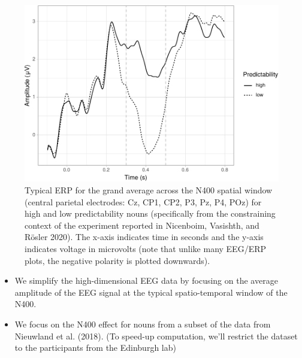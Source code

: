 \documentclass[12pt,ignorenonframetext,aspectratio=169]{beamer}
\providecommand{\tightlist}{%
  \setlength{\itemsep}{0pt}\setlength{\parskip}{0pt}}
\begin{document}
\begin{frame}

\small

\begin{figure}

{\centering \includegraphics[width=0.8\linewidth,height=0.7\textheight]{cc_figure/N400noun-1} 

}

\caption{Typical ERP for the grand average across the N400 spatial window (central parietal electrodes: Cz, CP1, CP2, P3, Pz, P4, POz) for high and low predictability nouns (specifically from the constraining context of the experiment reported in Nicenboim, Vasishth, and Rösler 2020). The x-axis indicates time in seconds and the y-axis indicates voltage in microvolts (note that unlike many EEG/ERP plots, the negative polarity is plotted downwards). }\label{fig:mot}
\end{figure}

\normalsize

\end{frame}

\begin{frame}

\begin{itemize}
\tightlist
\item
  We simplify the high-dimensional EEG data by focusing on the average amplitude of the EEG signal at the typical spatio-temporal window of the N400.
\item
  We focus on the N400 effect for nouns from a subset of the data from Nieuwland et al. (2018). (To speed-up computation, we'll restrict the dataset to the participants from the Edinburgh lab)
\end{itemize}

\end{frame}
\end{document}
